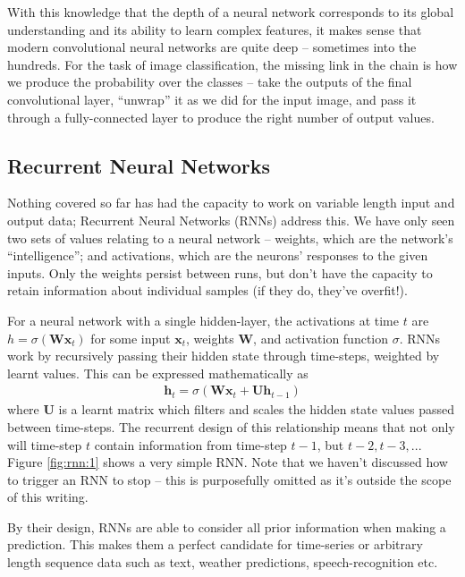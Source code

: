 \documentclass{report}
\begin{document}
	With this knowledge that the depth of a neural network corresponds to its global understanding and its ability to learn complex features, it makes sense that modern convolutional neural networks are quite deep -- sometimes into the hundreds. For the task of image classification, the missing link in the chain is how we produce the probability over the classes -- take the outputs of the final convolutional layer, ``unwrap'' it as we did for the input image, and pass it through a fully-connected layer to produce the right number of output values. \par
	
	\subsection{Recurrent Neural Networks}\label{rnn:1}
	Nothing covered so far has had the capacity to work on variable length input and output data; Recurrent Neural Networks (RNNs) address this. We have only seen two sets of values relating to a neural network -- weights, which are the network's ``intelligence''; and activations, which are the neurons' responses to the given inputs. Only the weights persist between runs, but don't have the capacity to retain information about individual samples (if they do, they've overfit!). \par
	For a neural network with a single hidden-layer, the activations at time $t$ are $h = \sigma(\bm{W}\bm{x}_t)$ for some input $\bm{x}_t$, weights $\bm{W}$, and activation function $\sigma$. RNNs work by recursively passing their hidden state through time-steps, weighted by learnt values. This can be expressed mathematically as 
	\begin{align}
		\bm{h}_{t} = \sigma(\bm{W}\bm{x}_t + \bm{U}\bm{h}_{t-1})
	\end{align}
	where $\bm{U}$ is a learnt matrix which filters and scales the hidden state values passed between time-steps. The recurrent design of this relationship means that not only will time-step $t$ contain information from time-step $t-1$, but $t-2, t-3, ...$ Figure \ref{fig:rnn:1} shows a very simple RNN. Note that we haven't discussed how to trigger an RNN to stop -- this is purposefully omitted as it's outside the scope of this writing. \par
	By their design, RNNs are able to consider all prior information when making a prediction. This makes them a perfect candidate for time-series or arbitrary length sequence data such as text, weather predictions, speech-recognition etc.
\end{document}
